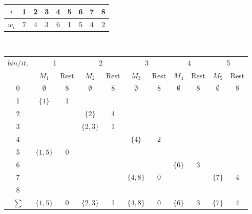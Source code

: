 \documentclass[12pt]{article}
\begin{document}
	\begin{figure}[H]
		\centering
		\begin{tabular}{c | c c c c c c c c}
			$i$ & 1 & 2 & 3 & 4 & 5 & 6 & 7 & 8 \\ \hline
			$w_i$ & 7 & 4 & 3 & 6 & 1 & 5 & 4 & 2\\
		\end{tabular} \\
	
		\begin{tabular}{c || c  c | c  c | c c | c c | c c}
			$bin/it.$ &  \multicolumn{2}{c}{1} & \multicolumn{2}{c}{2} & \multicolumn{2}{c}{3} & \multicolumn{2}{c}{4} & \multicolumn{2}{c}{5} \\ 
			 & $M_1$ & Rest & $M_2$ & Rest & $M_3$ & Rest & $M_4$ & Rest & $M_5$ & Rest \\ \hline\hline
			0 & $\emptyset$ & 8 &  $\emptyset$ & 8 &  $\emptyset$ & 8 &  $\emptyset$ & 8 &  $\emptyset$ & 8  \\
			1 & $\{1\}$ & 1	 	& $ $ & $ $ 		& $ $ & $ $ 		& $ $ & $ $ 	& $ $ & $ $ 	 \\
			2 & $ $ 	& $ $ 	& $\{2\}$ & 4 		& $ $ & $ $ 		& $ $ & $ $ 	& $ $ & $ $ 	 \\
			3 & $ $ 	& $ $ 	& $\{2,3\} $ & 1	& $ $ & $ $ 		& $ $ & $ $ 	& $ $ & $ $ 	 \\
			4 & $ $ 	& $ $ 	& $ $ & $ $ 		& $\{4\} $ & 2 		& $ $ & $ $ 	& $ $ & $ $ 	 \\
			5 & $\{1,5\}$ 	& 0	& $ $ & $ $ 		& $ $ & $ $ 		& $ $ & $ $ 	& $ $ & $ $ 	 \\
			6 & $ $ 	& $ $ 	& $ $ & $ $ 		& $ $ & $ $ 		& $\{6\} $ & 3 	& $ $ & $ $ 	 \\
			7 & $ $ 	& $ $ 	& $ $ & $ $ 		& $\{4,8\} $ & 0 		& $ $ & $ $ 	& $\{7\}$ & 4 	 \\
			8 & $ $ 	& $ $ 	& $ $ & $ $ 		& $ $ & $ $ 		& $ $ & $ $ 	& $ $ & $ $ 	 \\ \hline\hline
			$\sum$ & $\{1,5\}$ & 0 & $\{2,3\}$ & 1 & $\{4,8\}$ & 0 & $\{6\}$& 3 & $\{7\}$ & 4 \\
		\end{tabular}
	\end{figure}
	
\end{document}
